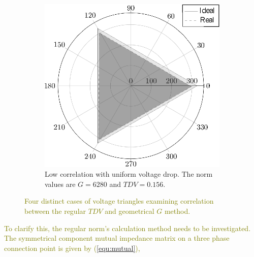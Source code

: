 \begin{figure}
\begin{subfigure}[b]{0.48\textwidth}
                    \includegraphics[width=\textwidth]{Unblance_EPS_Pics/EPS_images/circle.eps}
                    \caption{\centering Low correlation with uniform voltage drop. The norm values are $G=6280$ and $TDV=0.156$.}
                    \label{fig:cases_D}
                \end{subfigure}


                \caption{\textcolor{olive}{Four distinct cases of voltage triangles examining correlation between the regular $TDV$ and geometrical $G$ method.}}\label{fig:cases}
            \end{figure}

            \textcolor{olive}{To clarify this, the regular norm's calculation method needs to be investigated. The symmetrical component mutual impedance matrix on a three phase connection point is given by (\ref{equ:mutual}),}

